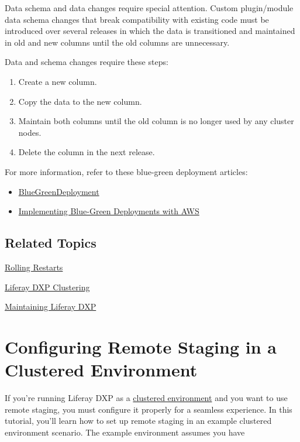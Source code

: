 Data schema and data changes require special attention. Custom
plugin/module data schema changes that break compatibility with existing
code must be introduced over several releases in which the data is
transitioned and maintained in old and new columns until the old columns
are unnecessary.

Data and schema changes require these steps:

\begin{enumerate}
\def\labelenumi{\arabic{enumi}.}
\item
  Create a new column.
\item
  Copy the data to the new column.
\item
  Maintain both columns until the old column is no longer used by any
  cluster nodes.
\item
  Delete the column in the next release.
\end{enumerate}

For more information, refer to these blue-green deployment articles:

\begin{itemize}
\item
  \href{http://martinfowler.com/bliki/BlueGreenDeployment.html}{BlueGreenDeployment}
\item
  \href{https://www.thoughtworks.com/insights/blog/implementing-blue-green-deployments-aws}{Implementing
  Blue-Green Deployments with AWS}
\end{itemize}

\section{Related Topics}\label{related-topics-2}

\href{/docs/7-2/deploy/-/knowledge_base/d/using-rolling-restarts}{Rolling
Restarts}

\href{/docs/7-2/deploy/-/knowledge_base/d/liferay-clustering}{Liferay
DXP Clustering}

\href{/docs/7-2/deploy/-/knowledge_base/d/maintaining-liferay}{Maintaining
Liferay DXP}

\chapter{Configuring Remote Staging in a Clustered
Environment}\label{configuring-remote-staging-in-a-clustered-environment}

If you're running Liferay DXP as a
\href{/docs/7-2/deploy/-/knowledge_base/d/liferay-clustering}{clustered
environment} and you want to use remote staging, you must configure it
properly for a seamless experience. In this tutorial, you'll learn how
to set up remote staging in an example clustered environment scenario.
The example environment assumes you have

